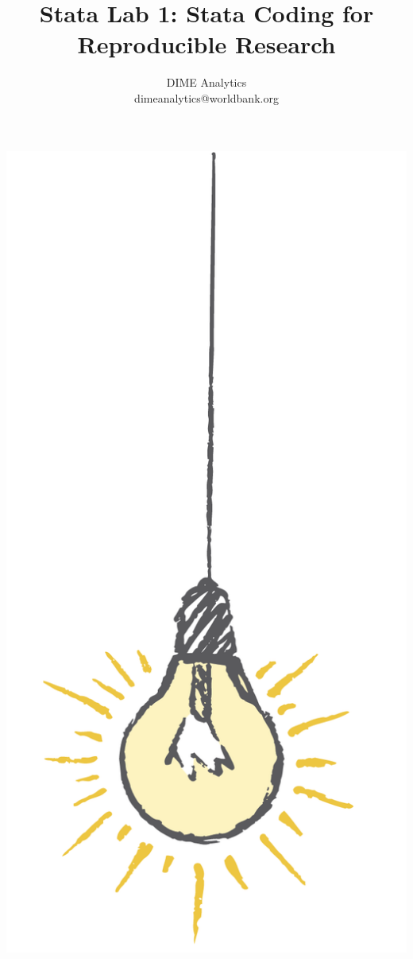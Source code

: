 \documentclass{tufte-handout}
\title{Stata Lab 1: Stata Coding for Reproducible Research}
\author{DIME Analytics \\ dimeanalytics@worldbank.org}
\begin{document}
\maketitle%

\begin{marginfigure}%
  \includegraphics[width=\linewidth]{light.png}
\end{marginfigure}
\end{document}
